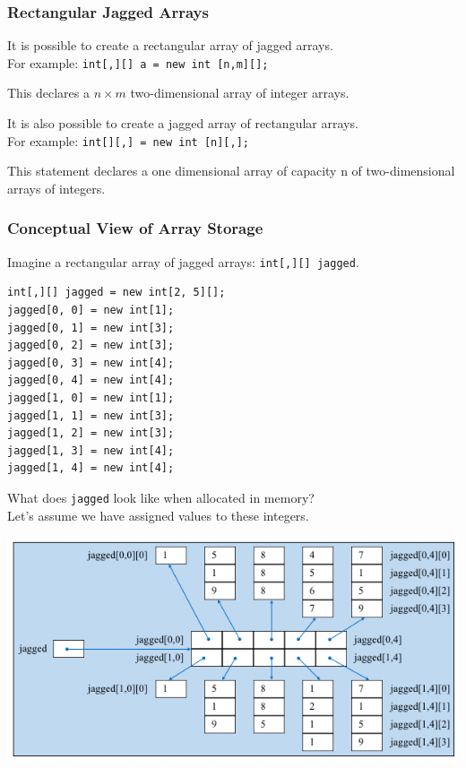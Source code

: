 \begin{frame}
\frametitle{Rectangular Jagged Arrays}
It is possible to create a rectangular array of jagged arrays.\\
\quad For example: \texttt{int[,][] a = new int [n,m][];}

This declares a $n \times m$ two-dimensional array of integer arrays.

It is also possible to create a jagged array of rectangular arrays.\\
\quad For example: \texttt{int[][,] = new int [n][,];}

This statement declares a one dimensional array of capacity n of two-dimensional arrays of integers.

\end{frame}


\begin{frame}[fragile]
\frametitle{Conceptual View of Array Storage}
Imagine a rectangular array of jagged arrays: \texttt{int[,][] jagged}.


\begin{verbatim}
int[,][] jagged = new int[2, 5][];
jagged[0, 0] = new int[1];
jagged[0, 1] = new int[3];
jagged[0, 2] = new int[3];
jagged[0, 3] = new int[4];
jagged[0, 4] = new int[4];
jagged[1, 0] = new int[1];
jagged[1, 1] = new int[3];
jagged[1, 2] = new int[3];
jagged[1, 3] = new int[4];
jagged[1, 4] = new int[4];
\end{verbatim}

\end{frame}

\begin{frame}

What does \texttt{jagged} look like when allocated in memory?\\
\quad Let's assume we have assigned values to these integers.

\begin{center}
\includegraphics[width=\textwidth]{images/jagged.png}
\end{center}

\end{frame}


